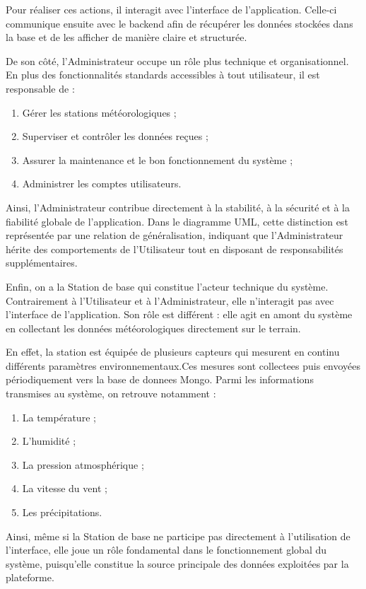 Pour réaliser ces actions, il interagit avec l’interface de l’application. Celle-ci communique ensuite avec le backend afin de récupérer les données stockées dans la base et de les afficher de manière claire et structurée.

De son côté, l’Administrateur occupe un rôle plus technique et organisationnel. En plus des fonctionnalités standards accessibles à tout utilisateur, il est responsable de :
\begin{enumerate}
    \item Gérer les stations météorologiques ;
    \item Superviser et contrôler les données reçues ;
    \item Assurer la maintenance et le bon fonctionnement du système ;
    \item Administrer les comptes utilisateurs.
\end{enumerate}

Ainsi, l’Administrateur contribue directement à la stabilité, à la sécurité et à la fiabilité globale de l’application. Dans le diagramme UML, cette distinction est représentée par une relation de généralisation, indiquant que l’Administrateur hérite des comportements de l’Utilisateur tout en disposant de responsabilités supplémentaires.

Enfin, on a la Station de base qui constitue l’acteur technique du système. Contrairement à l’Utilisateur et à l’Administrateur, elle n’interagit pas avec l’interface de l’application. Son rôle est différent : elle agit en amont du système en collectant les données météorologiques directement sur le terrain.

En effet, la station est équipée de plusieurs capteurs qui mesurent en continu différents paramètres environnementaux.Ces mesures sont collectees puis envoyées périodiquement vers la base de donnees Mongo. Parmi les informations transmises au système, on retrouve notamment :
\begin{enumerate}
    \item La température ;
    \item L’humidité ;
    \item La pression atmosphérique ;
    \item La vitesse du vent ;
    \item Les précipitations.
\end{enumerate} 

Ainsi, même si la Station de base ne participe pas directement à l’utilisation de l’interface, elle joue un rôle fondamental dans le fonctionnement global du système, puisqu’elle constitue la source principale des données exploitées par la plateforme.

